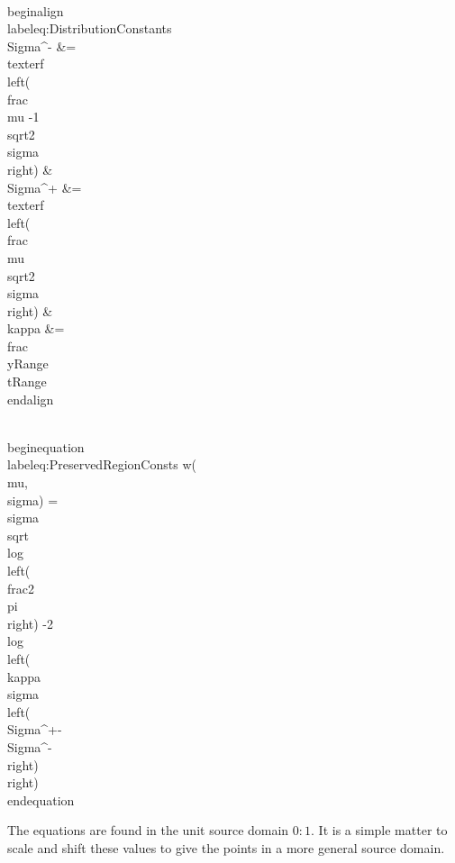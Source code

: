 \\begin{align}\\label{eq:DistributionConstants}
\\Sigma^- &= \\text{erf}\\left(\\frac{\\mu -1}{\\sqrt{2} \\sigma }\\right) &
 \\Sigma^+ &= \\text{erf}\\left(\\frac{\\mu }{\\sqrt{2} \\sigma }\\right) &
  \\kappa &= \\frac{\\yRange}{\\tRange} 
\\end{align}

\\begin{equation}\\label{eq:PreservedRegionConsts}
  w(\\mu,\\sigma)  =  \\sigma  \\sqrt{ \\log \\left(\\frac{2}{\\pi } \\right) -2 \\log \\left(\\kappa \\sigma  \\left(\\Sigma^+-\\Sigma^-\\right)\\right) }
\\end{equation}

The equations are found in the unit source domain $0:1$. It is a simple matter to scale and shift these values to give the points in a more general source domain.

